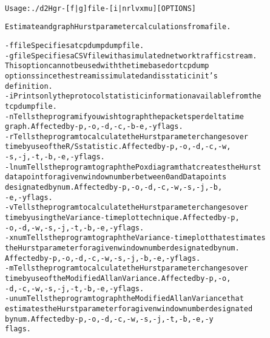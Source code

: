 \begin{alltt}
\label{verb:help}
Usage: ./d2Hgr -[f|g] file -[i|nrlvxmu] [OPTIONS]                               

Estimate and graph Hurst parameter calculations from a file.

   -f file   Specifies a tcpdump dump file.
   -g file   Specifies a CSV file with a simulated network traffic stream.
             This option cannot be used with the time based or tcpdump
             options since the stream is simulated and is static in it's
             definition.
   -i        Prints only the protocol statistic information available from the
             tcpdump file.
   -n        Tells the program if you wish to graph the packets per delta time
             graph. Affected by -p, -o, -d, -c, -b -e, -y flags.
   -r        Tells the program to calculate the Hurst parameter changes over
             time by use of the R/S statistic. Affected by -p, -o, -d, -c, -w,
             -s, -j, -t, -b, -e, -y flags.
   -l num    Tells the program to graph the Pox diagram that creates the Hurst
             data point for a given window number between 0 and Datapoints
             designated by num. Affected by -p, -o, -d, -c, -w, -s, -j, -b,
             -e, -y flags.
   -v        Tells the program to calculate the Hurst parameter changes over
             time by using the Variance-time plot technique. Affected by -p,
             -o, -d, -w, -s, -j, -t, -b, -e, -y flags.
   -x num    Tells the program to graph the Variance-time plot that estimates
             the Hurst parameter for a given window number designated by num.
             Affected by -p, -o, -d, -c, -w, -s, -j, -b, -e, -y flags.
   -m        Tells the program to calculate the Hurst parameter changes over
             time by use of the Modified Allan Variance. Affected by -p, -o,
             -d, -c, -w, -s, -j, -t, -b, -e, -y flags.
   -u num    Tells the program to graph the Modified Allan Variance that
             estimates the Hurst parameter for a given window number designated
             by num. Affected by -p, -o, -d, -c, -w, -s, -j, -t, -b, -e, -y
             flags.


\end{alltt}
